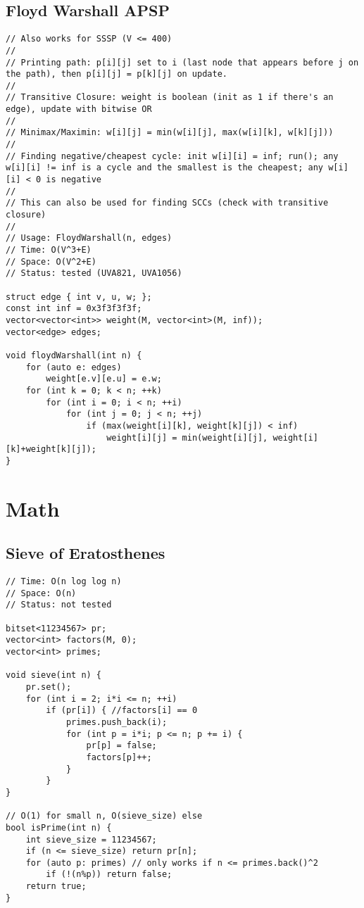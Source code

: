 \documentclass[12pt, a4paper, twoside]{article}
\begin{document}
\subsection{Floyd Warshall APSP}
\begin{lstlisting}
// Also works for SSSP (V <= 400)
//
// Printing path: p[i][j] set to i (last node that appears before j on the path), then p[i][j] = p[k][j] on update.
//
// Transitive Closure: weight is boolean (init as 1 if there's an edge), update with bitwise OR
//
// Minimax/Maximin: w[i][j] = min(w[i][j], max(w[i][k], w[k][j]))
//
// Finding negative/cheapest cycle: init w[i][i] = inf; run(); any w[i][i] != inf is a cycle and the smallest is the cheapest; any w[i][i] < 0 is negative
//
// This can also be used for finding SCCs (check with transitive closure)
//
// Usage: FloydWarshall(n, edges)
// Time: O(V^3+E)
// Space: O(V^2+E)
// Status: tested (UVA821, UVA1056)

struct edge { int v, u, w; };
const int inf = 0x3f3f3f3f;
vector<vector<int>> weight(M, vector<int>(M, inf));
vector<edge> edges;

void floydWarshall(int n) {
	for (auto e: edges)
		weight[e.v][e.u] = e.w;
	for (int k = 0; k < n; ++k)
		for (int i = 0; i < n; ++i)
			for (int j = 0; j < n; ++j)
				if (max(weight[i][k], weight[k][j]) < inf)
					weight[i][j] = min(weight[i][j], weight[i][k]+weight[k][j]);
}
\end{lstlisting}



\section{Math}

\subsection{Sieve of Eratosthenes}
\begin{lstlisting}
// Time: O(n log log n)
// Space: O(n)
// Status: not tested

bitset<11234567> pr;
vector<int> factors(M, 0);
vector<int> primes;

void sieve(int n) {
	pr.set();
	for (int i = 2; i*i <= n; ++i)
		if (pr[i]) { //factors[i] == 0
			primes.push_back(i);
			for (int p = i*i; p <= n; p += i) {
				pr[p] = false;
				factors[p]++;
			}
		}
}

// O(1) for small n, O(sieve_size) else
bool isPrime(int n) {
	int sieve_size = 11234567;
	if (n <= sieve_size) return pr[n];
	for (auto p: primes) // only works if n <= primes.back()^2
		if (!(n%p)) return false;
	return true;
}
\end{lstlisting}
\end{document}
